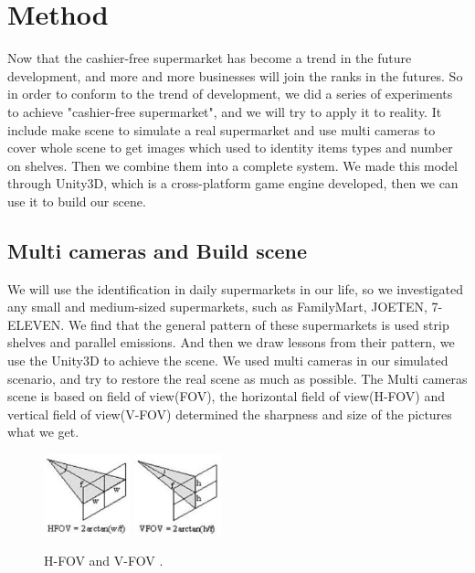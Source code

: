 \section{Method}

Now that the cashier-free supermarket has become a trend in the future development, and more and more businesses will join the ranks in the futures.
So in order to conform to the trend of development, we did a series of experiments to achieve "cashier-free supermarket", and we will try to apply it to reality.
It include make scene to simulate a real supermarket and use multi cameras to cover whole scene to get images which used to identity items types and number on shelves.
Then we combine them into a complete system.
We made this model through Unity3D, which is a cross-platform game engine developed, then we can use it to build our scene.


\subsection{Multi cameras and Build scene}

We will use the identification in daily supermarkets in our life, so we investigated any small and medium-sized supermarkets, such as FamilyMart, JOETEN, 7-ELEVEN.
We find that the general pattern of these supermarkets is used strip shelves and parallel emissions.
And then we draw lessons from their pattern, we use the Unity3D to achieve the scene.
We used multi cameras in our simulated scenario, and try to restore the real scene as much as possible.
The Multi cameras scene is based on field of view(FOV), the horizontal field of view(H-FOV) and vertical field of view(V-FOV)\cite{Ball88} determined the sharpness and size of the pictures what we get.

\begin{figure}[htbp]
\centerline{\includegraphics[width=2.5cm,scale=0.4]{HFOV.jpg} \includegraphics[width=2.5cm,scale=0.4]{VFOV.jpg}}
\caption{H-FOV and V-FOV .}
\label{fig}
\end{figure}

